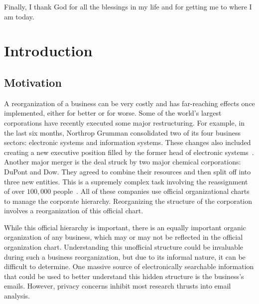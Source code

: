 \documentclass[12pt]{report}
\begin{document}
Finally, I thank God for all the blessings in my life and for getting me to where I am today.
\tableofcontents
\pagebreak

\listoffigures
\pagebreak

\listoftables
\pagebreak

\pagestyle{myheadings}

\chapter{Introduction} \label{Introduction}
\section{Motivation}
A reorganization of a business can be very costly and has far-reaching effects once implemented, either for better or for worse.
Some of the world's largest corporations have recently executed some major restructuring.
For example, in the last six months, Northrop Grumman consolidated two of its four business sectors: electronic systems and information systems.
These changes also included creating a new executive position filled by the former head of electronic systems~\cite{NG}.
Another major merger is the deal struck by two major chemical corporations: DuPont and Dow.
They agreed to combine their resources and then split off into three new entities.
This is a supremely complex task involving the reassignment of over $100,000$ people~\cite{dupont}.
All of these companies use official organizational charts to manage the corporate hierarchy.
Reorganizing the structure of the corporation involves a reorganization of this official chart.

While this official hierarchy is important, there is an equally important organic organization of any business, which may or may not be reflected in the official organization chart.
Understanding this unofficial structure could be invaluable during such a business reorganization, but due to its informal nature, it can be difficult to determine.
One massive source of electronically searchable information that could be used to better understand this hidden structure is the business's emails.
However, privacy concerns inhibit most research thrusts into email analysis.  
\end{document}
